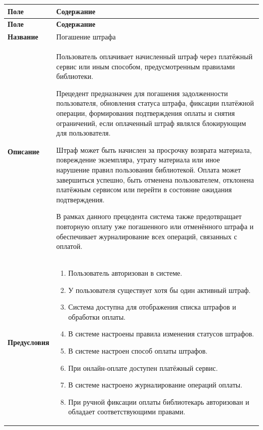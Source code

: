 \documentclass[12pt,a4paper]{article}
\begin{document}
		\begin{xltabular}{\textwidth}{
				|>{\raggedright\arraybackslash}p{2.7cm}
				|>{\raggedright\arraybackslash}X|
			}
			\hline
			\textbf{Поле} & \textbf{Содержание} \\
			\hline
			\endfirsthead
			
			\hline
			\textbf{Поле} & \textbf{Содержание} \\
			\hline
			\endhead
			
			\hline
			\endfoot
			
			\textbf{Название} &
			Погашение штрафа \\
			\hline
			
			\textbf{Описание} &
			Пользователь оплачивает начисленный штраф через платёжный сервис
			или иным способом, предусмотренным правилами библиотеки.
			
			Прецедент предназначен для погашения задолженности пользователя,
			обновления статуса штрафа, фиксации платёжной операции,
			формирования подтверждения оплаты и снятия ограничений, если
			оплаченный штраф являлся блокирующим для пользователя.
			
			Штраф может быть начислен за просрочку возврата материала,
			повреждение экземпляра, утрату материала или иное нарушение правил
			пользования библиотекой. Оплата может завершиться успешно, быть
			отменена пользователем, отклонена платёжным сервисом или перейти
			в состояние ожидания подтверждения.
			
			В рамках данного прецедента система также предотвращает повторную
			оплату уже погашенного или отменённого штрафа и обеспечивает
			журналирование всех операций, связанных с оплатой. \\
			\hline
			
			\textbf{Предусловия} &
			\begin{enumerate}
				\item Пользователь авторизован в системе.
				\item У пользователя существует хотя бы один активный штраф.
				\item Система доступна для отображения списка штрафов и обработки
				оплаты.
				\item В системе настроены правила изменения статусов штрафов.
				\item В системе настроен способ оплаты штрафов.
				\item При онлайн-оплате доступен платёжный сервис.
				\item В системе настроено журналирование операций оплаты.
				\item При ручной фиксации оплаты библиотекарь авторизован и обладает
				соответствующими правами.
			\end{enumerate} \\
			\hline
			

\end{xltabular}
\end{document}
